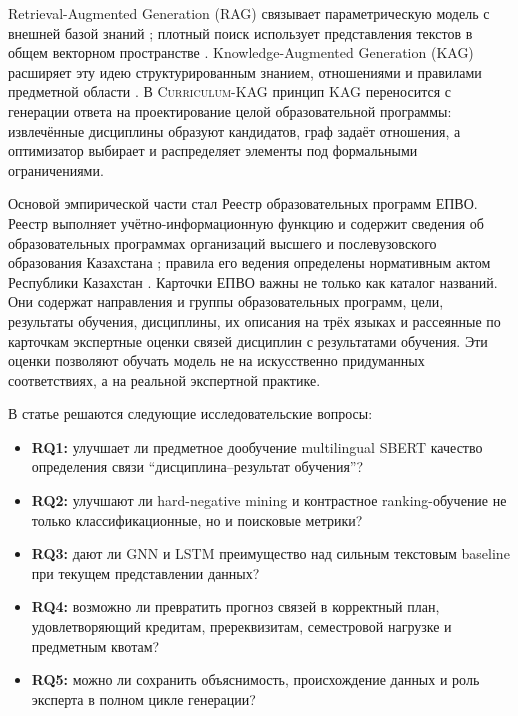 \documentclass[twoside,11pt]{article}
\newcommand{\systemname}{\textsc{Curriculum-KAG}}
\begin{document}
Retrieval-Augmented Generation (RAG) связывает параметрическую модель с внешней базой знаний \cite{Lewis2020}; плотный поиск использует представления текстов в общем векторном пространстве \cite{Karpukhin2020}. Knowledge-Augmented Generation (KAG) расширяет эту идею структурированным знанием, отношениями и правилами предметной области \cite{Liang2024,Hogan2021}. В \systemname{} принцип KAG переносится с генерации ответа на проектирование целой образовательной программы: извлечённые дисциплины образуют кандидатов, граф задаёт отношения, а оптимизатор выбирает и распределяет элементы под формальными ограничениями.

Основой эмпирической части стал Реестр образовательных программ ЕПВО. Реестр выполняет учётно-информационную функцию и содержит сведения об образовательных программах организаций высшего и послевузовского образования Казахстана \cite{EPVORegistry}; правила его ведения определены нормативным актом Республики Казахстан \cite{AdiletRegistry}. Карточки ЕПВО важны не только как каталог названий. Они содержат направления и группы образовательных программ, цели, результаты обучения, дисциплины, их описания на трёх языках и рассеянные по карточкам экспертные оценки связей дисциплин с результатами обучения. Эти оценки позволяют обучать модель не на искусственно придуманных соответствиях, а на реальной экспертной практике.

В статье решаются следующие исследовательские вопросы:
\begin{itemize}
  \item \textbf{RQ1:} улучшает ли предметное дообучение multilingual SBERT качество определения связи ``дисциплина--результат обучения''?
  \item \textbf{RQ2:} улучшают ли hard-negative mining и контрастное ranking-обучение не только классификационные, но и поисковые метрики?
  \item \textbf{RQ3:} дают ли GNN и LSTM преимущество над сильным текстовым baseline при текущем представлении данных?
  \item \textbf{RQ4:} возможно ли превратить прогноз связей в корректный план, удовлетворяющий кредитам, пререквизитам, семестровой нагрузке и предметным квотам?
  \item \textbf{RQ5:} можно ли сохранить объяснимость, происхождение данных и роль эксперта в полном цикле генерации?
\end{itemize}
\end{document}
